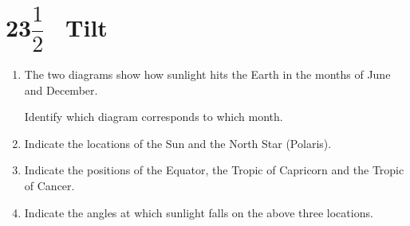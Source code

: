 \section{23$\dfrac{1}{2}$\degree~ Tilt}
\sunTilt
\begin{enumerate}[\style (1)] \resume
	
	\item The two diagrams show how sunlight hits the Earth in the months of June and December.
	
	Identify which diagram corresponds to which month.
	
	\item Indicate the locations of the Sun and the North Star (Polaris).
	
	\item Indicate the positions of the Equator, the Tropic of Capricorn and the Tropic of Cancer.
	
	\item Indicate the angles at which sunlight falls on the above three locations.

\end{enumerate}



